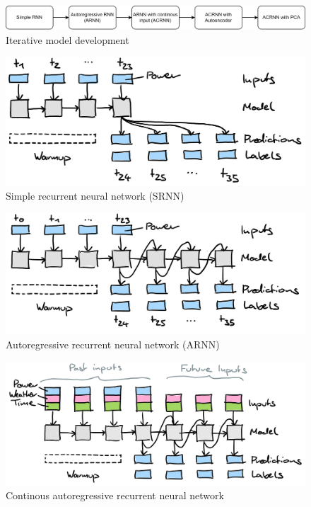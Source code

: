 \documentclass[11pt,table]{article}
\begin{document}
\begin{figure}[H]
	\centering
	\includegraphics[scale=1]{Figures/modelEvolution.png}
	\caption{Iterative model development}
	\label{fig:modelEvo}
\end{figure}

\begin{figure}[H]
	\centering
	\includegraphics[scale=1]{Figures/SRNN.png}
	\caption{Simple recurrent neural network (SRNN)}
	\label{fig:SRNN}
\end{figure}

\begin{figure}[H]
	\centering
	\includegraphics[scale=1]{Figures/ARNN.png}
	\caption{Autoregressive recurrent neural network (ARNN)}
	\label{fig:ARNN}
\end{figure}

\begin{figure}[H]
	\centering
	\includegraphics[scale=1]{Figures/continousARNN.png}
	\caption{Continous autoregressive recurrent neural network}
	\label{fig:continousARNN}
\end{figure}
\end{document}
